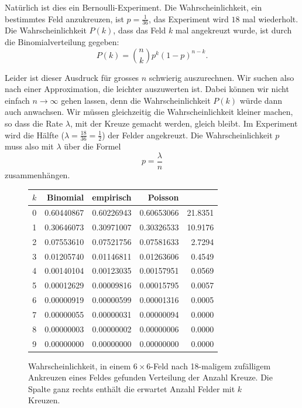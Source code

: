 Natürlich ist dies ein Bernoulli-Experiment.
Die Wahrscheinlichkeit, ein
bestimmtes Feld anzukreuzen, ist $p=\frac{1}{36}$, das Experiment
wird $18$ mal wiederholt.
Die Wahrscheinlichkeit $P(k)$, dass das Feld $k$ mal
angekreuzt wurde, ist durch die Binomialverteilung gegeben:
\[
P(k)=\binom{n}{k}p^k(1-p)^{n-k}.
\]

Leider ist dieser Ausdruck für grosses $n$ schwierig auszurechnen.
Wir suchen also nach einer Approximation, die leichter auszuwerten ist.
Dabei können wir nicht einfach $n\to\infty$ gehen lassen, denn die
Wahrscheinlichkeit $P(k)$ würde dann auch anwachsen.
Wir müssen
gleichzeitig die Wahrscheinlichkeit kleiner machen, so dass die Rate $\lambda$,
mit der Kreuze gemacht werden, gleich bleibt.
Im Experiment wird
die Hälfte ($\lambda=\frac{18}{36}=\frac12$) der Felder angekreuzt.
Die Wahrscheinlichkeit $p$ muss also mit $\lambda$ über die Formel
\[
p=\frac{\lambda}{n}
\]
zusammenhängen.

\begin{figure}
\begin{center}
\begin{tabular}{|r|r|r|r|r|}
\hline
$k$&Binomial&empirisch&Poisson&\\
\hline
0&   0.60440867 & 0.60226943 & 0.60653066 & 21.8351 \\
1&   0.30646073 & 0.30971007 & 0.30326533 & 10.9176 \\
2&   0.07553610 & 0.07521756 & 0.07581633 &  2.7294 \\
3&   0.01205740 & 0.01146811 & 0.01263606 &  0.4549 \\
4&   0.00140104 & 0.00123035 & 0.00157951 &  0.0569 \\
5&   0.00012629 & 0.00009816 & 0.00015795 &  0.0057 \\
6&   0.00000919 & 0.00000599 & 0.00001316 &  0.0005 \\
7&   0.00000055 & 0.00000031 & 0.00000094 &  0.0000 \\
8&   0.00000003 & 0.00000002 & 0.00000006 &  0.0000 \\
9&   0.00000000 & 0.00000000 & 0.00000000 &  0.0000 \\
\hline
\end{tabular}
\end{center}
\caption{Wahrscheinlichkeit, in einem $6\times 6$-Feld nach 18-maligem
zufälligem Ankreuzen eines Feldes gefunden Verteilung der Anzahl Kreuze.
Die Spalte ganz rechts enthält die erwartet Anzahl Felder mit $k$ Kreuzen.
\label{cross36}}
\end{figure}

